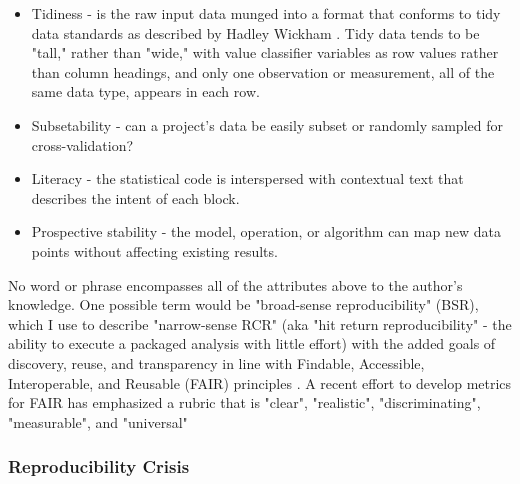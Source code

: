 \documentclass{drexelthesis}
\begin{document}
\begin{itemize}
	\item Tidiness - is the raw input data munged into a format that conforms to tidy data standards as described by Hadley Wickham \cite{Wickham2014-xj}. Tidy data tends to be "tall," rather than "wide," with value classifier variables as row values rather than column headings, and only one observation or measurement, all of the same data type, appears in each row.

	\item Subsetability - can a project’s data be easily subset or randomly sampled for cross-validation?

	\item Literacy - the statistical code is interspersed with contextual text that describes the intent of each block.

	\item Prospective stability - the model, operation, or algorithm can map new data points without affecting existing results.

\end{itemize}
No word or phrase encompasses all of the attributes above to the author's knowledge. One possible term would be "broad-sense reproducibility" (BSR), which I use to describe  "narrow-sense RCR" (aka "hit return reproducibility" - the ability to execute a packaged analysis with little effort) with the added goals of discovery, reuse, and transparency in line with Findable, Accessible, Interoperable, and Reusable (FAIR) principles \cite{Wilkinson2016-qr}. A recent effort to develop metrics for FAIR has emphasized a rubric that is "clear", "realistic", "discriminating", "measurable", and "universal" \cite{Wilkinson2017-hf}

\subsubsection{Reproducibility Crisis}
\end{document}
